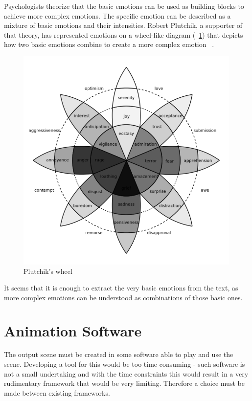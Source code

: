 Psychologists theorize that the basic emotions can be used as building blocks to achieve more complex emotions. The specific emotion can be described as a mixture of basic emotions and their intensities. Robert Plutchik, a supporter of that theory, has represented emotions on a wheel-like diagram (~\ref{fig:wheel}) that depicts how two basic emotions combine to create a more complex emotion ~\cite{basicemo}.

\begin{figure}[H]
\centerline{\includegraphics[width = 30em]{img/wheel.png}}
\caption{Plutchik's wheel}\label{fig:wheel}
\end{figure}

It seems that it is enough to extract the very basic emotions from the text, as more complex emotions can be understood as combinations of those basic ones.


\section{Animation Software}
\label{sec:animchoice}

The output scene must be created in some software able to play and use the scene. Developing a tool for this would be too time consuming - such software is not a small undertaking and with the time constraints this would result in a very rudimentary framework that would be very limiting. Therefore a choice must be made between existing frameworks.

